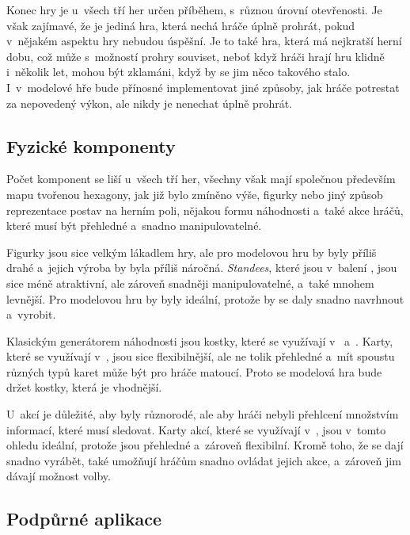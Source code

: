 Konec hry je u~všech tří her určen příběhem, s~různou úrovní otevřenosti. Je však zajímavé, že  je jediná hra, která nechá hráče úplně prohrát, pokud v~nějakém aspektu hry nebudou úspěšní. Je to také hra, která má nejkratší herní dobu, což může s~možností prohry souviset, neboť když hráči hrají hru klidně i~několik let, mohou být zklamáni, když by se jim něco takového stalo. I~v~modelové hře bude přínosné implementovat jiné způsoby, jak hráče potrestat za nepovedený výkon, ale nikdy je nenechat úplně prohrát.

\subsection{Fyzické komponenty}
\label{subsec:comparison_components}

Počet komponent se liší u~všech tří her, všechny však mají společnou především mapu tvořenou hexagony, jak již bylo zmíněno výše, figurky nebo jiný způsob reprezentace postav na herním poli, nějakou formu náhodnosti a~také akce hráčů, které musí být přehledné a~snadno manipulovatelné.

Figurky  jsou sice velkým lákadlem hry, ale pro modelovou hru by byly příliš drahé a~jejich výroba by byla příliš náročná. \textit{Standees}, které jsou v~balení , jsou sice méně atraktivní, ale zároveň snadněji manipulovatelné, a~také mnohem levnější. Pro modelovou hru by byly ideální, protože by se daly snadno navrhnout a~vyrobit.

Klasickým generátorem náhodnosti jsou kostky, které se využívají v~\dnd{} a~. Karty, které se využívají v~, jsou sice flexibilnější, ale ne tolik přehledné a~mít spoustu různých typů karet může být pro hráče matoucí. Proto se modelová hra bude držet kostky, která je vhodnější.

U~akcí je důležité, aby byly různorodé, ale aby hráči nebyli přehlcení množstvím informací, které musí sledovat. Karty akcí, které se využívají v~, jsou v~tomto ohledu ideální, protože jsou přehledné a~zároveň flexibilní. Kromě toho, že se dají snadno vyrábět, také umožňují hráčům snadno ovládat jejich akce, a~zároveň jim dávají možnost volby.

\subsection{Podpůrné aplikace}
\label{subsec:comparison_apps}

